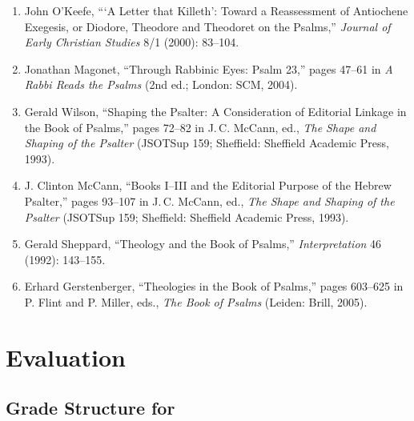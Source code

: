 \documentclass[titlepage]{article}
\begin{document}
\begin{enumerate}
 \item John O’Keefe, “‘A Letter that Killeth’: Toward a Reassessment of Antiochene Exegesis, or Diodore, Theodore and Theodoret on the Psalms,” \emph{Journal of Early Christian Studies} 8/1 (2000): 83–104.
 \item Jonathan Magonet, “Through Rabbinic Eyes: Psalm 23,” pages 47–61 in \emph{A Rabbi Reads the Psalms} (2nd ed.; London: SCM, 2004).
 \item Gerald Wilson, “Shaping the Psalter: A Consideration of Editorial Linkage in the Book of Psalms,” pages 72–82 in J.\,C. McCann, ed., \emph{The Shape and Shaping of the Psalter} (JSOTSup 159; Sheffield: Sheffield Academic Press, 1993).
 \item J. Clinton McCann, “Books I–III and the Editorial Purpose of the Hebrew Psalter,” pages 93–107 in J.\,C. McCann, ed., \emph{The Shape and Shaping of the Psalter} (JSOTSup 159; Sheffield: Sheffield Academic Press, 1993).
 \item Gerald Sheppard, “Theology and the Book of Psalms,” \emph{Interpretation} 46 (1992): 143–155.
 \item Erhard Gerstenberger, “Theologies in the Book of Psalms,” pages 603–625 in P. Flint and P. Miller, eds., \emph{The Book of Psalms} (Leiden: Brill, 2005).
\end{enumerate}

\section{Evaluation}
\label{evaluation}

\subsection{Grade Structure for \ccode}
\label{structure}

\end{document}
